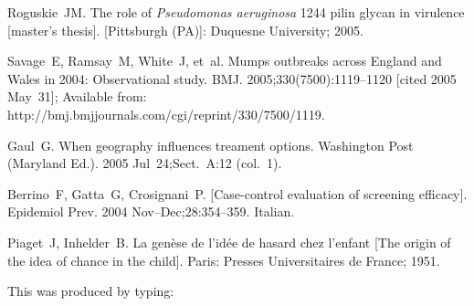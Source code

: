 \documentclass[]{interact}
\theoremstyle{plain}%
\theoremstyle{definition}
\theoremstyle{remark}
\begin{document}
\begin{thebibliography}{99}
Roguskie~JM. The role of \emph{Pseudomonas aeruginosa} 1244 pilin glycan in
  virulence [master's thesis]. [Pittsburgh (PA)]: Duquesne University; 2005.

Savage~E, Ramsay~M, White~J, et~al. Mumps outbreaks across England and Wales
  in 2004: Observational study. BMJ. 2005;330(7500):1119--1120 [cited 2005
  May~31]; Available from: http://bmj.bmjjournals.com/cgi/reprint/330/7500/1119.

Gaul~G. When geography influences treament options. Washington Post (Maryland
  Ed.). 2005 Jul~24;Sect.~A:12 (col.~1).

Berrino~F, Gatta~G, Crosignani~P. [Case-control evaluation of screening
  efficacy]. Epidemiol Prev. 2004 Nov--Dec;28:354--359. Italian.

Piaget~J, Inhelder~B. La gen{\`e}se de l'id{\'e}e de hasard chez l'enfant
  [The origin of the idea of chance in the child]. Paris: Presses
  Universitaires de France; 1951.

\end{thebibliography}
\bigskip
\noindent This was produced by typing:
\end{document}
